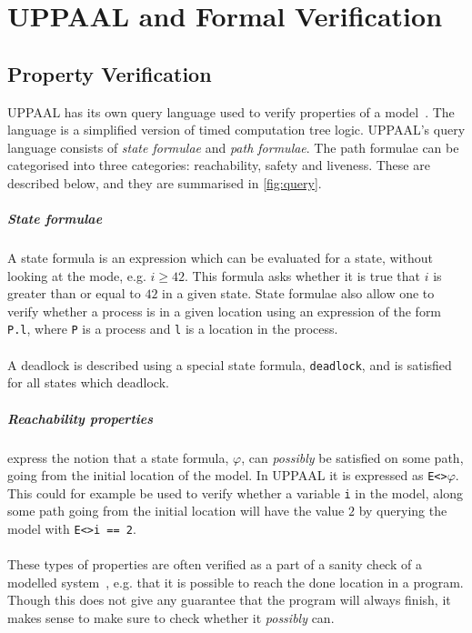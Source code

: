 \chapter{UPPAAL and Formal Verification}\label{chap:upp}


\section{Property Verification}
UPPAAL has its own query language used to verify properties of a model~\cite[p. 204]{upptut}. The language is a simplified version of timed computation tree logic. UPPAAL's query language consists of \textit{state formulae} and \textit{path formulae}. The path formulae can be categorised into three categories: reachability, safety and liveness. These are described below, and they are summarised in \cref{fig:query}.
\paragraph{State formulae}
A state formula is an expression which can be evaluated for a state, without looking at the mode, e.g. $i \geq 42$. This formula asks whether it is true that $i$ is greater than or equal to $42$ in a given state. State formulae also allow one to verify whether a process is in a given location using an expression of the form \texttt{P.l}, where \texttt{P} is a process and \texttt{l} is a location in the process.\\\\
A deadlock is described using a special state formula, \texttt{deadlock}, and is satisfied for all states which deadlock.
\paragraph{Reachability properties} express the notion that a state formula, $\varphi$, can \textit{possibly} be satisfied on some path, going from the initial location of the model. In UPPAAL it is expressed as \texttt{E<>$\varphi$}. This could for example be used to verify whether a variable \texttt{i} in the model, along some path going from the initial location will have the value $2$ by querying the model with \texttt{E<>i == 2}.\\\\
These types of properties are often verified as a part of a sanity check of a modelled system~\cite[p. 205]{upptut}, e.g. that it is possible to reach the done location in a \jc program. Though this does not give any guarantee that the program will always finish, it makes sense to make sure to check whether it \textit{possibly} can.

